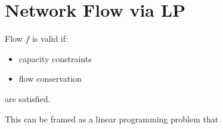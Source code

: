 \section{Network Flow via LP}

Flow $f$ is valid if:
\begin{itemize}
    \item capacity constraints
    \item flow conservation
\end{itemize}
are satisfied.

This can be framed as a linear programming problem that
